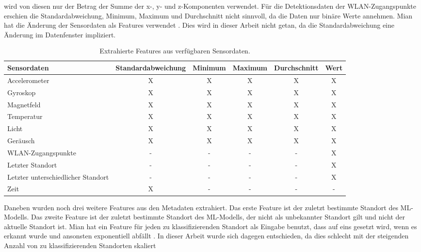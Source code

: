 wird von diesen nur der Betrag der Summe der x-, y- und z-Komponenten verwendet.
Für die Detektionsdaten der WLAN-Zugangspunkte erschien die Standardabweichung, Minimum, Maximum und Durchschnitt nicht sinnvoll, da die Daten nur binäre Werte annehmen.
Mian hat die Änderung der Sensordaten als Features verwendet \cite{naveedThesis}.
Dies wird in dieser Arbeit nicht getan, da die Standardabweichung eine Änderung im Datenfenster impliziert.
\begin{table}[h!]
    \hspace{-0.5cm}
    \begin{tabular}{ | p{3.2cm} | c | c | c | c | c | }
        \hline
        Sensordaten & Standardabweichung & Minimum & Maximum & Durchschnitt & Wert \\\hline
        Accelerometer & X & X & X & X & X \\\hline
        Gyroskop & X & X & X & X & X \\\hline
        Magnetfeld & X & X & X & X & X \\\hline
        Temperatur & X & X & X & X & X \\\hline
        Licht & X & X & X & X & X \\\hline
        Geräusch & X & X & X & X & X \\\hline
        WLAN-Zugangspunkte & - & - & - & - & X \\\hline
        Letzter Standort & - & - & - & - & X \\\hline
        Letzter unterschiedlicher Standort & - & - & - & - & X \\\hline
        Zeit & X & - & - & - & - \\\hline
    \end{tabular}
    \caption{Extrahierte Features aus verfügbaren Sensordaten.}
    \label{tab:all_features}
\end{table}
\newline
\newline
Daneben wurden noch drei weitere Features aus den Metadaten extrahiert.
Das erste Feature ist der zuletzt bestimmte Standort des ML-Modells.
Das zweite Feature ist der zuletzt bestimmte Standort des ML-Modells, der nicht als unbekannter Standort gilt und nicht der aktuelle Standort ist.
Mian hat ein Feature für jeden zu klassifizierenden Standort als Eingabe benutzt, dass auf eins gesetzt wird, wenn es erkannt wurde und ansonsten exponentiell abfällt \cite{naveedThesis}.
In dieser Arbeit wurde sich dagegen entschieden, da dies schlecht mit der steigenden Anzahl von zu klassifizierenden Standorten skaliert
